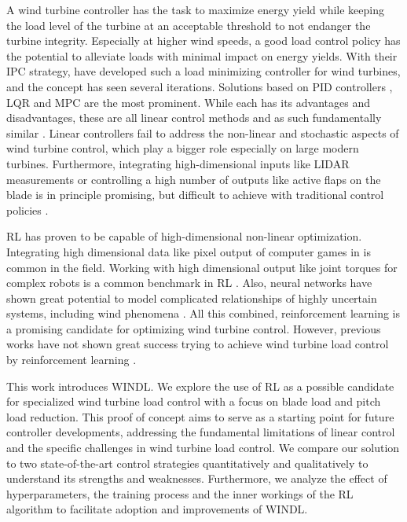 A wind turbine controller has the task to maximize energy yield while keeping the load level of the turbine at an acceptable threshold to not endanger the turbine integrity. Especially at higher wind speeds, a good load control policy has the potential to alleviate loads with minimal impact on energy yields. With their \ac{IPC} strategy, \citet{bossanyiIndividualBladePitch2003} have developed such a load minimizing controller for wind turbines, and the concept has seen several iterations. Solutions based on PID controllers \cite{bossanyiFurtherLoadReductions2005}, \ac{LQR} \cite{bossanyiIndividualBladePitch2003} and \ac{MPC} \cite{petrovicMPCFrameworkConstrained2021} are the most prominent. While each has its advantages and disadvantages, these are all linear control methods and as such fundamentally similar \cite{lioFundamentalPerformanceSimilarities2017}. Linear controllers fail to address the non-linear and stochastic aspects of wind turbine control, which play a bigger role especially on large modern turbines. Furthermore, integrating high-dimensional inputs like LIDAR measurements or controlling a high number of outputs like active flaps on the blade is in principle promising, but difficult to achieve with traditional control policies \cite{bossanyiWindTurbineControl2014} \cite{perez-beckerActiveFlapControl2021} \cite{barlasReviewStateArt2010}.

\acf{RL} has proven to be capable of high-dimensional non-linear optimization. Integrating high dimensional data like pixel output of computer games in \citet{mnihPlayingAtariDeep2013} is common in the field. Working with high dimensional output like joint torques for complex robots is a common benchmark in \ac{RL} \cite{brockmanOpenAIGym2016}. Also, neural networks have shown great potential to model complicated relationships of highly uncertain systems, including wind phenomena \cite{demolliWindPowerForecasting2019}. All this combined, reinforcement learning is a promising candidate for optimizing wind turbine control. However, previous works have not shown great success trying to achieve wind turbine load control by reinforcement learning \cite{coqueletBiomimeticIndividualPitch2020}.

This work introduces \acf{WINDL}. We explore the use of \ac{RL} as a possible candidate for specialized wind turbine load control with a focus on blade load and pitch load reduction. This proof of concept aims to serve as a starting point for future controller developments, addressing the fundamental limitations of linear control and the specific challenges in wind turbine load control. We compare our solution to two state-of-the-art control strategies quantitatively and qualitatively to understand its strengths and weaknesses. Furthermore, we analyze the effect of hyperparameters, the training process and the inner workings of the \ac{RL} algorithm to facilitate adoption and improvements of \ac{WINDL}.


